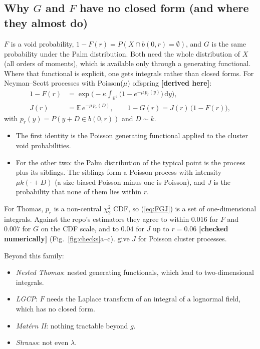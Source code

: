 \documentclass[10pt,a4paper]{article}
\newcommand{\checked}{\textcolor{green!45!black}{\textbf{[checked numerically]}}}
\newcommand{\derived}{\textcolor{green!45!black}{\textbf{[derived here]}}}
\newcommand{\E}{\mathbb{E}}
\newcommand{\R}{\mathbb{R}}
\newcommand{\dd}{\,\mathrm{d}}
\begin{document}
\subsection{\texorpdfstring{Why $G$ and $F$ have no closed form (and where they almost do)}{Why G and F have no closed form}}\label{sec:GF}
$F$ is a void probability, $1-F(r)=P(X\cap b(0,r)=\emptyset)$, and $G$ is the same probability under the Palm distribution. Both need the whole distribution of $X$ (all orders of moments), which is available only through a generating functional. Where that functional is explicit, one gets integrals rather than closed forms. For Neyman--Scott processes with Poisson($\mu$) offspring \derived{}:
\begin{equation}
\begin{aligned}
1-F(r)&=\exp\Big(-\kappa\int_{\R^2}\big(1-e^{-\mu\,p_r(y)}\big)\dd y\Big),\\
J(r)&=\E\,e^{-\mu\,p_r(D)},\qquad 1-G(r)=J(r)\,\big(1-F(r)\big),
\end{aligned}
\label{eq:FGJ}
\end{equation}
with $p_r(y)=P(y+D\in b(0,r))$ and $D\sim k$.
\begin{itemize}
  \item The first identity is the Poisson generating functional applied to the cluster void probabilities.
  \item For the other two: the Palm distribution of the typical point is the process plus its siblings. The siblings form a Poisson process with intensity $\mu k(\cdot+D)$ (a size-biased Poisson minus one is Poisson), and $J$ is the probability that none of them lies within $r$.
\end{itemize}
For Thomas, $p_r$ is a non-central $\chi^2_2$ CDF, so (\ref{eq:FGJ}) is a set of one-dimensional integrals. Against the repo's estimators they agree to within $0.016$ for $F$ and $0.007$ for $G$ on the CDF scale, and to $0.04$ for $J$ up to $r=0.06$ \checked{} (Fig.~\ref{fig:checks}a--c). \citet{vanLieshoutBaddeley1996} give $J$ for Poisson cluster processes.

Beyond this family:
\begin{itemize}
  \item \emph{Nested Thomas}: nested generating functionals, which lead to two-dimensional integrals.
  \item \emph{LGCP}: $F$ needs the Laplace transform of an integral of a lognormal field, which has no closed form.
  \item \emph{Mat\'ern II}: nothing tractable beyond $g$.
  \item \emph{Strauss}: not even $\lambda$.
\end{itemize}
\end{document}
